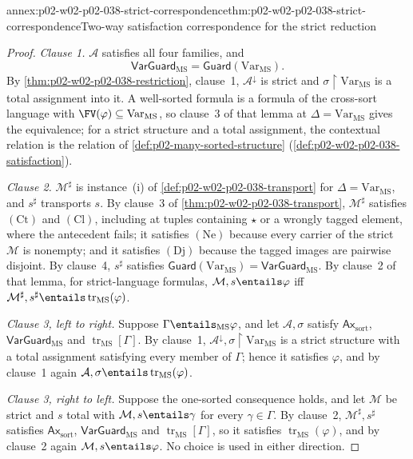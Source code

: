 \begin{annexitem}{annex:p02-w02-p02-038-strict-correspondence}{thm:p02-w02-p02-038-strict-correspondence}{Two-way satisfaction correspondence for the strict reduction}
\begin{proof}
\emph{Clause 1.}  \(\mathcal A\) satisfies all four families, and
\[
 \mathsf{VarGuard}_{\mathrm{MS}}=\mathsf{Guard}(\mathrm{Var}_{\mathrm{MS}}).
\]
By \cref{thm:p02-w02-p02-038-restriction}, clause~1, \(\mathcal A^{\downarrow}\)
is strict and \(\sigma{\restriction}\mathrm{Var}_{\mathrm{MS}}\) is a total
assignment into it.  A well-sorted formula is a formula of the cross-sort
language with \(\FV(\varphi)\subseteq\mathrm{Var}_{\mathrm{MS}}\), so clause~3
of that lemma at \(\Delta=\mathrm{Var}_{\mathrm{MS}}\) gives the equivalence;
for a strict structure and a total assignment, the contextual relation is
the relation of \cref{def:p02-many-sorted-structure}
(\cref{def:p02-w02-p02-038-satisfaction}).

\emph{Clause 2.}  \(\mathcal M^{\sharp}\) is instance~(i) of
\cref{def:p02-w02-p02-038-transport} for \(\Delta=\mathrm{Var}_{\mathrm{MS}}\),
and \(s^{\sharp}\) transports \(s\).  By clause~3 of
\cref{thm:p02-w02-p02-038-transport}, \(\mathcal M^{\sharp}\) satisfies
\((\mathrm{Ct})\) and \((\mathrm{Cl})\), including at tuples containing
\(\star\) or a wrongly tagged element, where the antecedent fails; it
satisfies \((\mathrm{Ne})\) because every carrier of the strict
\(\mathcal M\) is nonempty; and it satisfies \((\mathrm{Dj})\) because the
tagged images are pairwise disjoint.  By clause~4,
\(s^{\sharp}\) satisfies
\(\mathsf{Guard}(\mathrm{Var}_{\mathrm{MS}})=\mathsf{VarGuard}_{\mathrm{MS}}\).
By clause~2 of that lemma, for strict-language formulas,
\(\mathcal M,s\entails\varphi\) iff
\(\mathcal M^{\sharp},s^{\sharp}\entails\operatorname{tr}_{\mathrm{MS}}(\varphi)\).

\emph{Clause 3, left to right.}  Suppose
\(\Gamma\entails_{\mathrm{MS}}\varphi\), and let \(\mathcal A,\sigma\) satisfy
\(\mathsf{Ax}_{\mathrm{sort}}\), \(\mathsf{VarGuard}_{\mathrm{MS}}\) and
\(\operatorname{tr}_{\mathrm{MS}}[\Gamma]\).  By clause~1,
\(\mathcal A^{\downarrow},\sigma{\restriction}\mathrm{Var}_{\mathrm{MS}}\) is a
strict structure with a total assignment satisfying every member of
\(\Gamma\); hence it satisfies \(\varphi\), and by clause~1 again
\(\mathcal A,\sigma\entails\operatorname{tr}_{\mathrm{MS}}(\varphi)\).

\emph{Clause 3, right to left.}  Suppose the one-sorted consequence holds,
and let \(\mathcal M\) be strict and \(s\) total with \(\mathcal M,s\entails
\gamma\) for every \(\gamma\in\Gamma\).  By clause~2,
\(\mathcal M^{\sharp},s^{\sharp}\) satisfies \(\mathsf{Ax}_{\mathrm{sort}}\),
\(\mathsf{VarGuard}_{\mathrm{MS}}\) and
\(\operatorname{tr}_{\mathrm{MS}}[\Gamma]\), so it satisfies
\(\operatorname{tr}_{\mathrm{MS}}(\varphi)\), and by clause~2 again
\(\mathcal M,s\entails\varphi\).  No choice is used in either direction.
\end{proof}
\end{annexitem}

